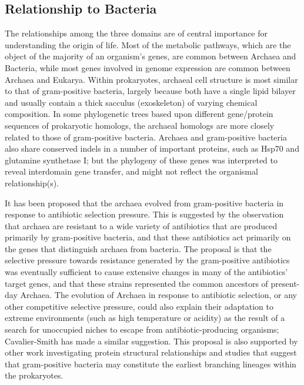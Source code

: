 \hypertarget{relationship-to-bacteria}{%
\subsection{Relationship to Bacteria}\label{relationship-to-bacteria}}

The relationships among the three domains are of central importance for understanding the origin of life. Most of the metabolic pathways, which are the object of the majority of an organism's genes, are common between Archaea and Bacteria, while most genes involved in genome expression are common between Archaea and Eukarya. Within prokaryotes, archaeal cell structure is most similar to that of gram-positive bacteria, largely because both have a single lipid bilayer and usually contain a thick sacculus (exoskeleton) of varying chemical composition. In some phylogenetic trees based upon different gene/protein sequences of prokaryotic homologs, the archaeal homologs are more closely related to those of gram-positive bacteria. Archaea and gram-positive bacteria also share conserved indels in a number of important proteins, such as Hsp70 and glutamine synthetase I; but the phylogeny of these genes was interpreted to reveal interdomain gene transfer, and might not reflect the organismal relationship(s).

It has been proposed that the archaea evolved from gram-positive bacteria in response to antibiotic selection pressure. This is suggested by the observation that archaea are resistant to a wide variety of antibiotics that are produced primarily by gram-positive bacteria, and that these antibiotics act primarily on the genes that distinguish archaea from bacteria. The proposal is that the selective pressure towards resistance generated by the gram-positive antibiotics was eventually sufficient to cause extensive changes in many of the antibiotics' target genes, and that these strains represented the common ancestors of present-day Archaea. The evolution of Archaea in response to antibiotic selection, or any other competitive selective pressure, could also explain their adaptation to extreme environments (such as high temperature or acidity) as the result of a search for unoccupied niches to escape from antibiotic-producing organisms; Cavalier-Smith has made a similar suggestion. This proposal is also supported by other work investigating protein structural relationships and studies that suggest that gram-positive bacteria may constitute the earliest branching lineages within the prokaryotes.

